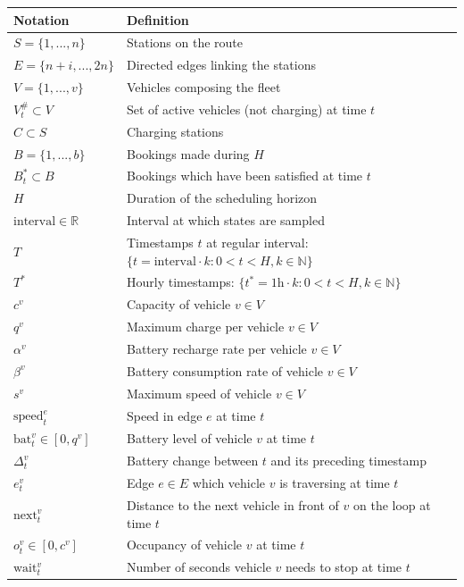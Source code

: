 \documentclass[12pt,a4paper]{article}
\begin{document}
\begin{table}
  \centering
\begin{tabularx}{\linewidth}{| l | Y |} 
  \hline			
  Notation & Definition \\
  \hline		
  $S = \{1,..., n\}$ & Stations on the route \\
  $E =  \{n+i,..., 2n\}$ & Directed edges linking the stations \\
  $V = \{1,..., v\}$ & Vehicles composing the fleet \\
  $V^{\#}_{t} \subset V$ & Set of active vehicles (not charging) at time $t$ \\
  $C \subset S$ & Charging stations \\
  $B = \{1,..., b\}$ & Bookings made during $H$ \\
  $B^{*} _{t}\subset B$ & Bookings which have been satisfied at time $t$\\
  
  $H$ & Duration of the scheduling horizon \\
  $ \text{interval} \in \mathbb{R}$ & Interval at which states are sampled \\
  $T$ & Timestamps $t$ at regular interval: $\{t = \text{interval} \cdot k:  0 < t < H, k \in \mathbb{N}\}$ \\
  $T^{*}$& Hourly timestamps: $\{t^{*} = 1\text{h} \cdot k:  0 < t < H, k \in \mathbb{N} \}$  \\
  $c^{v}$ & Capacity of vehicle $v \in V$\\
  $q^{v}$ & Maximum charge per vehicle $v \in V$\\
  $\alpha^{v}$ & Battery recharge rate per vehicle $v \in V$\\
  $\beta^{v}$ & Battery consumption rate of vehicle $v \in V$\\
  $s^{v}$ & Maximum speed of vehicle $v \in V$ \\
  
  $\text{speed}^{e}_{t}$ & Speed in edge $e$ at time $t$ \\
  $\text{bat}^{v}_{t} \in [0, q^{v}]$ & Battery level of vehicle $v$ at time $t$ \\  
  $\Delta^{v}_{t}$ & Battery change between $t$ and its preceding timestamp \\  
  $e^{v}_{t}$ & Edge $e \in E$ which vehicle $v$ is traversing at time $t$ \\
  $\text{next}^{v}_{t}$ &  Distance to the next vehicle in front of $v$ on the loop at time $t$ \\
  $o^{v}_{t} \in [0, c^{v}]$ & Occupancy of vehicle $v$ at time $t$ \\
  $\text{wait}^{v}_{t}$ & Number of seconds vehicle $v$ needs to stop at time $t$ \\  
  

\end{tabularx}
\end{table}
\end{document}

